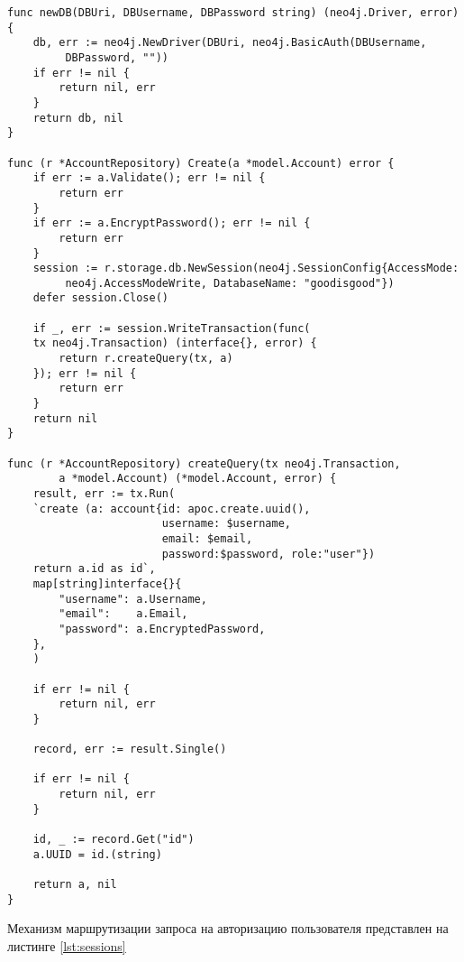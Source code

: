 \begin{lstlisting}[label=lst:db,caption=Установка соединения и отправка запросов]
func newDB(DBUri, DBUsername, DBPassword string) (neo4j.Driver, error) {
	db, err := neo4j.NewDriver(DBUri, neo4j.BasicAuth(DBUsername,
		 DBPassword, ""))
	if err != nil {
		return nil, err
	}
	return db, nil
}

func (r *AccountRepository) Create(a *model.Account) error {
	if err := a.Validate(); err != nil {
		return err
	}
	if err := a.EncryptPassword(); err != nil {
		return err
	}
	session := r.storage.db.NewSession(neo4j.SessionConfig{AccessMode:
		 neo4j.AccessModeWrite, DatabaseName: "goodisgood"})
	defer session.Close()
	
	if _, err := session.WriteTransaction(func(
	tx neo4j.Transaction) (interface{}, error) {
		return r.createQuery(tx, a)
	}); err != nil {
		return err
	}
	return nil
}

func (r *AccountRepository) createQuery(tx neo4j.Transaction, 
		a *model.Account) (*model.Account, error) {
	result, err := tx.Run(
	`create (a: account{id: apoc.create.uuid(),
						username: $username,
						email: $email,
						password:$password, role:"user"}) 
	return a.id as id`,
	map[string]interface{}{
		"username": a.Username,
		"email":    a.Email,
		"password": a.EncryptedPassword,
	},
	)
	
	if err != nil {
		return nil, err
	}
	
	record, err := result.Single()
	
	if err != nil {
		return nil, err
	}
	
	id, _ := record.Get("id")
	a.UUID = id.(string)
	
	return a, nil
}
\end{lstlisting}
Механизм маршрутизации запроса на авторизацию пользователя представлен на листинге \ref{lst:sessions}
